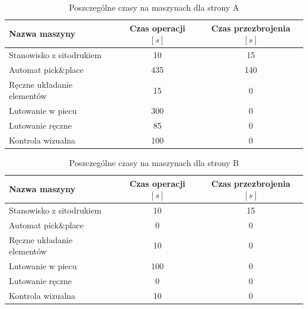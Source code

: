 \begin{table}[H]
	\centering
	\caption{Poszczególne czasy na maszynach dla strony A}
	\begin{tabular}{lcc}
		\toprule
		Nazwa maszyny                 & Czas operacji $[s]$ & Czas przezbrojenia $[s]$ \\
		\midrule
		Stanowisko z sitodrukiem      & 10                  & 15                       \\
		Automat pick\&place           & 435                 & 140                      \\
		Ręczne układanie elementów & 15                  & 0                        \\
		Lutowanie w piecu             & 300                 & 0                        \\
		Lutowanie ręczne             & 85                  & 0                        \\
		Kontrola wizualna             & 100                 & 0                        \\
		\bottomrule
	\end{tabular}
	\label{chilliboard:A}
\end{table}

\begin{table}[H]
	\centering
	\caption{Poszczególne czasy na maszynach dla strony B}
	\begin{tabular}{lcc}
		\toprule
		Nazwa maszyny                 & Czas operacji $[s]$ & Czas przezbrojenia $[s]$ \\
		\midrule
		Stanowisko z sitodrukiem      & 10                  & 15                       \\
		Automat pick\&place           & 0                   & 0                        \\
		Ręczne układanie elementów & 10                  & 0                        \\
		Lutowanie w piecu             & 100                 & 0                        \\
		Lutowanie ręczne             & 0                   & 0                        \\
		Kontrola wizualna             & 10                  & 0                        \\
		\bottomrule
	\end{tabular}
	\label{chilliboard:B}
\end{table}

